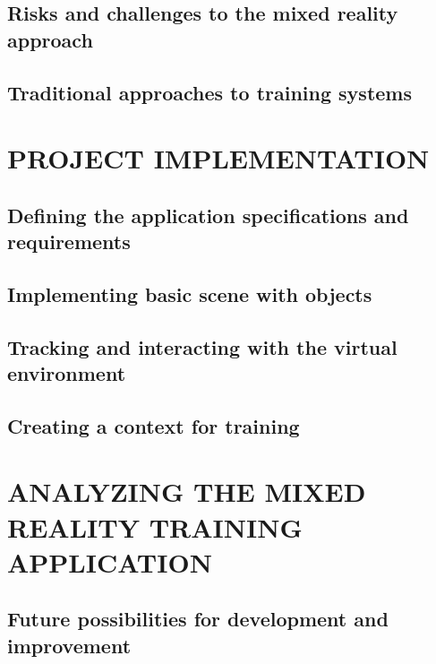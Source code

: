 \documentclass[12pt, a4paper,oneside, nocenter]{thesis}
\begin{document}
\section{Risks and challenges to the mixed reality approach}
\section{Traditional approaches to training systems}
\par
\chapter{\MakeUppercase{Project implementation}}
\section{Defining the application specifications and requirements}
\section{Implementing basic scene with objects}
\section{Tracking and interacting with the virtual environment}
\section{Creating a context for training}

\par
\chapter{\MakeUppercase{Analyzing the mixed reality training application}}

\section{Future possibilities for development and improvement}


\newpage

\nocite{*}

\end{document}

